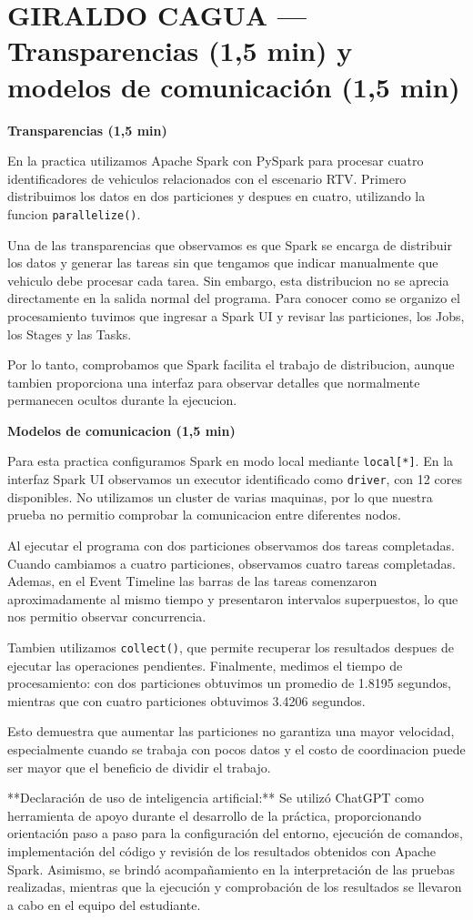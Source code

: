 \section*{GIRALDO CAGUA — Transparencias (1,5 min) y modelos de comunicación (1,5 min)}

\textbf{Transparencias (1,5 min)}

En la practica utilizamos Apache Spark con PySpark para procesar cuatro identificadores de vehiculos relacionados con el escenario RTV. Primero distribuimos los datos en dos particiones y despues en cuatro, utilizando la funcion \texttt{parallelize()}.

Una de las transparencias que observamos es que Spark se encarga de distribuir los datos y generar las tareas sin que tengamos que indicar manualmente que vehiculo debe procesar cada tarea. Sin embargo, esta distribucion no se aprecia directamente en la salida normal del programa. Para conocer como se organizo el procesamiento tuvimos que ingresar a Spark UI y revisar las particiones, los Jobs, los Stages y las Tasks.

Por lo tanto, comprobamos que Spark facilita el trabajo de distribucion, aunque tambien proporciona una interfaz para observar detalles que normalmente permanecen ocultos durante la ejecucion.

\textbf{Modelos de comunicacion (1,5 min)}

Para esta practica configuramos Spark en modo local mediante \texttt{local[*]}. En la interfaz Spark UI observamos un executor identificado como \texttt{driver}, con 12 cores disponibles. No utilizamos un cluster de varias maquinas, por lo que nuestra prueba no permitio comprobar la comunicacion entre diferentes nodos.

Al ejecutar el programa con dos particiones observamos dos tareas completadas. Cuando cambiamos a cuatro particiones, observamos cuatro tareas completadas. Ademas, en el Event Timeline las barras de las tareas comenzaron aproximadamente al mismo tiempo y presentaron intervalos superpuestos, lo que nos permitio observar concurrencia.

Tambien utilizamos \texttt{collect()}, que permite recuperar los resultados despues de ejecutar las operaciones pendientes. Finalmente, medimos el tiempo de procesamiento: con dos particiones obtuvimos un promedio de 1.8195 segundos, mientras que con cuatro particiones obtuvimos 3.4206 segundos.

Esto demuestra que aumentar las particiones no garantiza una mayor velocidad, especialmente cuando se trabaja con pocos datos y el costo de coordinacion puede ser mayor que el beneficio de dividir el trabajo.

**Declaración de uso de inteligencia artificial:** Se utilizó ChatGPT como herramienta de apoyo durante el desarrollo de la práctica, proporcionando orientación paso a paso para la configuración del entorno, ejecución de comandos, implementación del código y revisión de los resultados obtenidos con Apache Spark. Asimismo, se brindó acompañamiento en la interpretación de las pruebas realizadas, mientras que la ejecución y comprobación de los resultados se llevaron a cabo en el equipo del estudiante.
